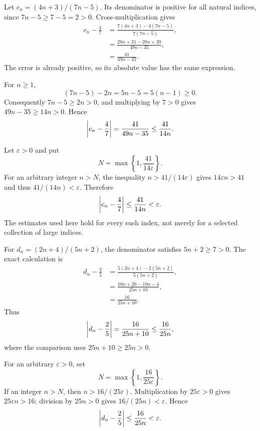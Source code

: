 Let $c_n=(4n+3)/(7n-5)$. Its denominator is positive for all natural
indices, since $7n-5\ge7-5=2>0$. Cross-multiplication gives
\begin{align*}
 c_n-\frac47
   &=\frac{7(4n+3)-4(7n-5)}{7(7n-5)},\\
   &=\frac{28n+21-28n+20}{49n-35},\\
   &=\frac{41}{49n-35}.
\end{align*}
The error is already positive, so its absolute value has the same
expression.

For $n\ge1$,
\[
 (7n-5)-2n=5n-5=5(n-1)\ge0.
\]
Consequently $7n-5\ge2n>0$, and multiplying by $7>0$ gives
$49n-35\ge14n>0$. Hence
\[
 \left|c_n-\frac47\right|=\frac{41}{49n-35}\le\frac{41}{14n}.
\]

Let $\varepsilon>0$ and put
\[
 N=\max\left\{1,\frac{41}{14\varepsilon}\right\}.
\]
For an arbitrary integer $n>N$, the inequality
$n>41/(14\varepsilon)$ gives $14\varepsilon n>41$ and thus
$41/(14n)<\varepsilon$. Therefore
\[
 \left|c_n-\frac47\right|\le\frac{41}{14n}<\varepsilon.
\]
The estimates used here hold for every such index, not merely for a
selected collection of large indices.


For $d_n=(2n+4)/(5n+2)$, the denominator satisfies $5n+2\ge7>0$.
The exact calculation is
\begin{align*}
 d_n-\frac25
   &=\frac{5(2n+4)-2(5n+2)}{5(5n+2)},\\
   &=\frac{10n+20-10n-4}{25n+10},\\
   &=\frac{16}{25n+10}.
\end{align*}
Thus
\[
 \left|d_n-\frac25\right|=\frac{16}{25n+10}\le\frac{16}{25n},
\]
where the comparison uses $25n+10\ge25n>0$.

For an arbitrary $\varepsilon>0$, set
\[
 N=\max\left\{1,\frac{16}{25\varepsilon}\right\}.
\]
If an integer $n>N$, then $n>16/(25\varepsilon)$.
Multiplication by $25\varepsilon>0$ gives $25\varepsilon n>16$;
division by $25n>0$ gives $16/(25n)<\varepsilon$. Hence
\[
 \left|d_n-\frac25\right|\le\frac{16}{25n}<\varepsilon.
\]


